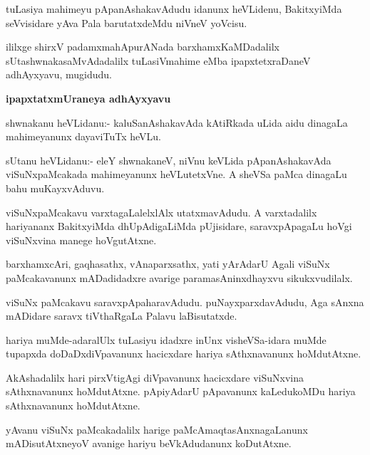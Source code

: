 \begin{mng}
tuLasiya mahimeyu pApanAshakavAdudu idanunx heVLidenu, BakitxyiMda seVvisidare yAva Pala barutatxdeMdu niVneV yoVcisu.
\end{mng}
ililxge shirxV padamxmahApurANada barxhamxKaMDadalilx sUtashwnakasaMvAdadalilx tuLasiVmahime eMba ipapxtetxraDaneV adhAyxyavu, mugidudu.

\begin{center}
\textbf{\large ipapxtatxmUraneya adhAyxyavu}
\end{center}

\begin{mng}
shwnakanu heVLidanu:- kaluSanAshakavAda kAtiRkada uLida aidu dinagaLa mahimeyanunx dayaviTuTx heVLu.
\end{mng}

\begin{mng}
sUtanu heVLidanu:- eleY shwnakaneV, niVnu keVLida pApanAshakavAda viSuNxpaMcakada mahimeyanunx heVLutetxVne. A sheVSa paMca dinagaLu bahu muKayxvAduvu.
\end{mng}

\begin{mng}
viSuNxpaMcakavu varxtagaLalelxlAlx utatxmavAdudu. A varxtadalilx hariyananx BakitxyiMda dhUpAdigaLiMda pUjisidare, saravxpApagaLu hoVgi viSuNxvina manege hoVgutAtxne.
\end{mng}

\begin{mng}
barxhamxcAri, gaqhasathx, vAnaparxsathx, yati yArAdarU Agali viSuNx paMcakavanunx mADadidadxre avarige paramasAninxdhayxvu sikukxvudilalx.
\end{mng}

\begin{mng}
viSuNx paMcakavu saravxpApaharavAdudu. puNayxparxdavAdudu, Aga sAnxna mADidare saravx tiVthaRgaLa Palavu laBisutatxde.
\end{mng}

\begin{mng}
hariya muMde-adaralUlx tuLasiyu idadxre inUnx visheVSa-idara muMde tupapxda doDaDxdiVpavanunx hacicxdare hariya sAthxnavanunx hoMdutAtxne.
\end{mng}

\begin{mng}
AkAshadalilx hari pirxVtigAgi diVpavanunx hacicxdare viSuNxvina sAthxnavanunx hoMdutAtxne. pApiyAdarU pApavanunx kaLedukoMDu hariya sAthxnavanunx hoMdutAtxne.
\end{mng}

\begin{mng}
yAvanu viSuNx paMcakadalilx harige paMcAmaqtasAnxnagaLanunx mADisutAtxneyoV avanige hariyu beVkAdudanunx koDutAtxne.
\end{mng}

